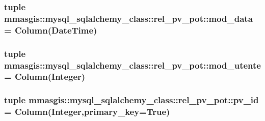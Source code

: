 \label{classmmasgis_1_1mysql__sqlalchemy__class_1_1rel__pv__pot_a66ea7d4fc8691eb43ae79064b2ca1728}
\hypertarget{classmmasgis_1_1mysql__sqlalchemy__class_1_1rel__pv__pot_a928e24f1f2f35fc4ff10a9e7f4c285cb}{
\subsubsection[{mod\_\-data}]{\setlength{\rightskip}{0pt plus 5cm}tuple {\bf mmasgis::mysql\_\-sqlalchemy\_\-class::rel\_\-pv\_\-pot::mod\_\-data} = Column(DateTime)}}
\label{classmmasgis_1_1mysql__sqlalchemy__class_1_1rel__pv__pot_a928e24f1f2f35fc4ff10a9e7f4c285cb}
\hypertarget{classmmasgis_1_1mysql__sqlalchemy__class_1_1rel__pv__pot_af83999f786a33c30426688b477db5f3f}{
\subsubsection[{mod\_\-utente}]{\setlength{\rightskip}{0pt plus 5cm}tuple {\bf mmasgis::mysql\_\-sqlalchemy\_\-class::rel\_\-pv\_\-pot::mod\_\-utente} = Column(Integer)}}
\label{classmmasgis_1_1mysql__sqlalchemy__class_1_1rel__pv__pot_af83999f786a33c30426688b477db5f3f}
\hypertarget{classmmasgis_1_1mysql__sqlalchemy__class_1_1rel__pv__pot_abb705238ad6888bf82c48a7b82d1d982}{
\subsubsection[{pv\_\-id}]{\setlength{\rightskip}{0pt plus 5cm}tuple {\bf mmasgis::mysql\_\-sqlalchemy\_\-class::rel\_\-pv\_\-pot::pv\_\-id} = Column(Integer,primary\_\-key=True)}}
